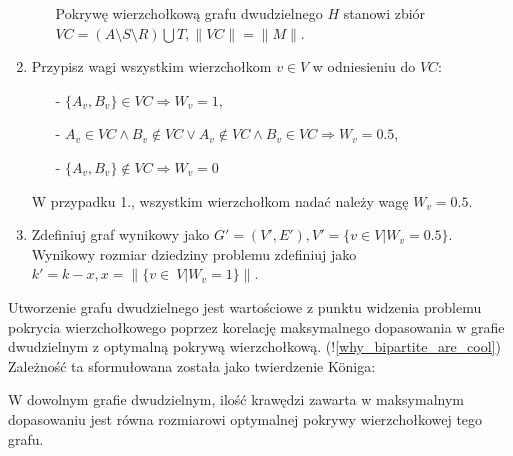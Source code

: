 \begin{enumerate}
\begin{itemize}
        Pokrywę wierzchołkową grafu dwudzielnego $H$ stanowi zbiór 
        ${VC=(A \setminus S \setminus R) \bigcup T}, \|VC\|=\|M\|$.
    \end{itemize}
  \item Przypisz wagi wszystkim wierzchołkom $v \in V$ w odniesieniu do $VC$:
    \begin{itemize}
      \item[-] $\{A_v, B_v\} \in VC \Rightarrow W_v=1$,
      \item[-] $A_v \in VC \land B_v \notin VC \lor A_v \notin VC \land B_v \in
        VC \Rightarrow W_v=0.5$,
      \item[-] $\{A_v, B_v\} \notin VC \Rightarrow W_v=0$
    \end{itemize}
    W przypadku 1., wszystkim wierzchołkom nadać należy wagę $W_v=0.5$.
  \item Zdefiniuj graf wynikowy jako 
    $G\prime=(V\prime, E\prime), V\prime=\{v \in V|W_v=0.5\}$.
    Wynikowy rozmiar dziedziny problemu zdefiniuj jako 
    ${k\prime=k-x, x=\|\{v\in~V|W_v=1\}}\|$.
\end{enumerate}

Utworzenie grafu dwudzielnego jest wartościowe z punktu widzenia problemu
pokrycia wierzchołkowego poprzez korelację maksymalnego dopasowania w grafie
dwudzielnym z optymalną pokrywą wierzchołkową. (!\ref{why_bipartite_are_cool})
Zależność ta sformułowana została jako twierdzenie K\"oniga:

\begin{konig*}
  W dowolnym grafie dwudzielnym, ilość krawędzi zawarta w maksymalnym
  dopasowaniu jest równa rozmiarowi optymalnej pokrywy wierzchołkowej tego
  grafu.
\end{konig*}

